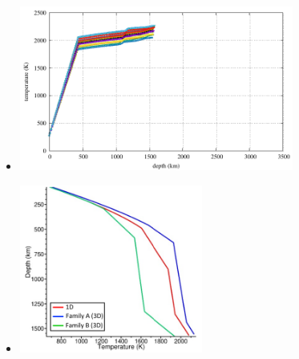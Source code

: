 \begin{itemize}
\item {}

\begin{center}
\includegraphics[width=9cm]{images/mars/density/khhd23/T.pdf}
\end{center}

\item {}

\begin{center}
\includegraphics[width=6cm]{images/mars/temperature/drsg24}
\end{center}

\end{itemize}

